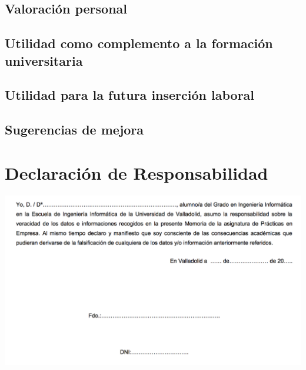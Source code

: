 \documentclass[10pt, a4paper,spanish]{article}
\begin{document}
        \subsection{Valoración personal}


        \subsection{Utilidad como complemento a la formación universitaria}


        \subsection{Utilidad para la futura inserción laboral}


        \subsection{Sugerencias de mejora}



    \newpage
    \section{Declaración de Responsabilidad}

        \includegraphics[width=\textwidth]{res/responsibility-declaration}
\end{document}
